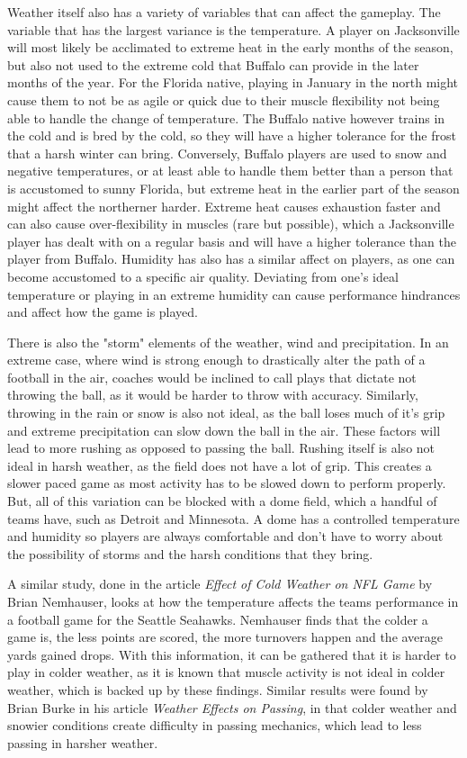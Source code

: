 \documentclass[12pt]{article}
\begin{document}
Weather itself also has a variety of variables that can affect the gameplay. The variable that has the largest variance is the temperature. A player on Jacksonville will most likely be acclimated to extreme heat in the early months of the season, but also not used to the extreme cold that Buffalo can provide in the later months of the year. For the Florida native, playing in January in the north might cause them to not be as agile or quick due to their muscle flexibility not being able to handle the change of temperature. The Buffalo native however trains in the cold and is bred by the cold, so they will have a higher tolerance for the frost that a harsh winter can bring. Conversely, Buffalo players are used to snow and negative temperatures, or at least able to handle them better than a person that is accustomed to sunny Florida, but extreme heat in the earlier part of the season might affect the northerner harder. Extreme heat causes exhaustion faster and can also cause over-flexibility in muscles (rare but possible), which a Jacksonville player has dealt with on a regular basis and will have a higher tolerance than the player from Buffalo. Humidity has also has a similar affect on players, as one can become accustomed to a specific air quality. Deviating from one's ideal temperature or playing in an extreme humidity can cause performance hindrances and affect how the game is played.

There is also the "storm" elements of the weather, wind and precipitation. In an extreme case, where wind is strong enough to drastically alter the path of a football in the air, coaches would be inclined to call plays that dictate not throwing the ball, as it would be harder to throw with accuracy. Similarly, throwing in the rain or snow is also not ideal, as the ball loses much of it's grip and extreme precipitation can slow down the ball in the air. These factors will lead to more rushing as opposed to passing the ball. Rushing itself is also not ideal in harsh weather, as the field does not have a lot of grip. This creates a slower paced game as most activity has to be slowed down to perform properly. But, all of this variation can be blocked with a dome field, which a handful of teams have, such as Detroit and Minnesota. A dome has a controlled temperature and humidity so players are always comfortable and don't have to worry about the possibility of storms and the harsh conditions that they bring.

A similar study, done in the article \textit{Effect of Cold Weather on NFL Game} by Brian Nemhauser, looks at how the temperature affects the teams performance in a football game for the Seattle Seahawks. Nemhauser finds that the colder a game is, the less points are scored, the more turnovers happen and the average yards gained drops. With this information, it can be gathered that it is harder to play in colder weather, as it is known that muscle activity is not ideal in colder weather, which is backed up by these findings. Similar results were found by Brian Burke in his article \textit{Weather Effects on Passing}, in that colder weather and snowier conditions create difficulty in passing mechanics, which lead to less passing in harsher weather.
\end{document}
